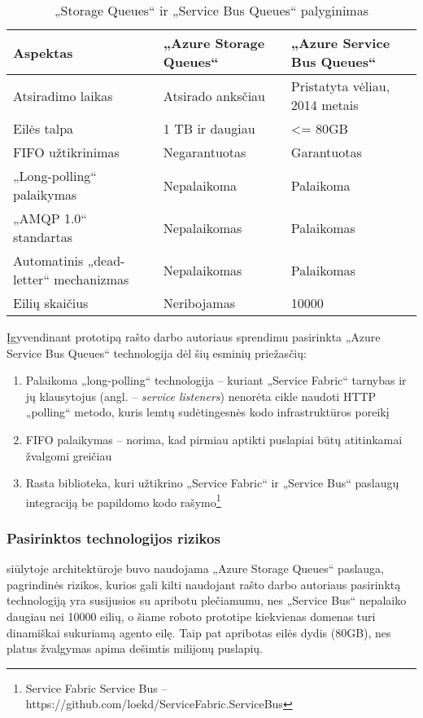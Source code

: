 \begin{table}[htbp]
  \centering
  \caption{„Storage Queues“ ir „Service Bus Queues“ palyginimas \cite{QueuesStorageVsServiceBus}}
    \begin{tabular}{|l|l|l|}
    \hline
    \textbf{Aspektas} & \textbf{„Azure Storage Queues“} & \textbf{„Azure Service Bus Queues“} \bigstrut\\
    \hline
    Atsiradimo laikas & Atsirado anksčiau & Pristatyta vėliau, 2014 metais \\
    \hline
    Eilės talpa & 1 TB ir daugiau & <= 80GB \\
    \hline
    FIFO užtikrinimas & Negarantuotas & Garantuotas \\
    \hline
    „Long-polling“ palaikymas & Nepalaikoma & Palaikoma \\
    \hline
    „AMQP 1.0“ standartas & Nepalaikomas & Palaikomas \\
    \hline
    Automatinis „dead-letter“ mechanizmas & Nepalaikomas & Palaikomas \\
    \hline
    Eilių skaičius & Neribojamas & 10000 \\
    \hline
    \end{tabular}%
  \label{tab:agent_registry_table}%
\end{table}%

Įgyvendinant prototipą rašto darbo autoriaus sprendimu pasirinkta „Azure Service Bus Queues“ technologija dėl šių esminių priežasčių:

\begin{enumerate}
    \item Palaikoma „long-polling“ technologija -- kuriant „Service Fabric“ tarnybas ir jų klausytojus (angl. -- \textit{service listeners}) nenorėta cikle naudoti HTTP „polling“ metodo, kuris lemtų sudėtingesnės kodo infrastruktūros poreikį
    \item FIFO palaikymas -- norima, kad pirmiau aptikti puslapiai būtų atitinkamai žvalgomi greičiau
    \item Rasta biblioteka, kuri užtikrino „Service Fabric“ ir „Service Bus“ paslaugų integraciją be papildomo kodo rašymo\footnote{Service Fabric Service Bus -- https://github.com/loekd/ServiceFabric.ServiceBus}
\end{enumerate}

\subsubsection{Pasirinktos technologijos rizikos}

\cite{MercedCloudBasedWebCrawler} siūlytoje architektūroje buvo naudojama „Azure Storage Queues“ paslauga, pagrindinės rizikos, kurios gali kilti naudojant rašto darbo autoriaus pasirinktą technologiją yra susijusios su apribotu plečiamumu, nes „Service Bus“ nepalaiko daugiau nei 10000 eilių, o šiame roboto prototipe kiekvienas domenas turi dinamiškai sukuriamą agento eilę. Taip pat apribotas eilės dydis (80GB), nes platus žvalgymas apima dešimtis milijonų puslapių.